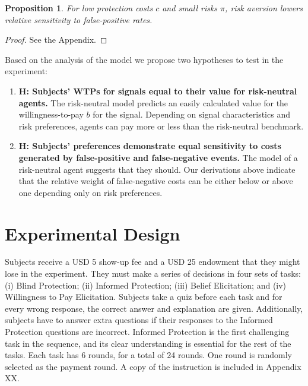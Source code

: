 \documentclass[12pt,a4paper]{article}
\newtheorem{theorem}{Proposition}
\begin{document}
\begin{theorem}
For low protection costs $c$ and small risks $\pi$, risk aversion lowers relative sensitivity to false-positive rates. 
\end{theorem}\label{thm:riskAverse2}  

\begin{proof}
See the Appendix.
\end{proof}


\noindent Based on the analysis of the model we propose two hypotheses to test in the experiment:
\begin{enumerate}
\item \textbf{H: Subjects' WTPs for signals equal to their value for risk-neutral agents.} The risk-neutral model predicts an easily calculated value for the willingness-to-pay $b$ for the signal. Depending on signal characteristics and risk preferences, agents can pay more or less than the risk-neutral benchmark. 
\item \textbf{H: Subjects' preferences demonstrate equal sensitivity to costs generated by false-positive and false-negative events.} The model of a risk-neutral agent suggests that they should. Our derivations above indicate that the relative weight of false-negative costs can be either below or above one depending only on risk preferences.
\end{enumerate}




\vspace{20pt}

\section{Experimental Design}

Subjects receive a USD 5 show-up fee and a USD 25 endowment that they might lose in the experiment. They must make a series of decisions in four sets of tasks: (i) Blind Protection; (ii) Informed Protection; (iii) Belief Elicitation; and (iv) Willingness to Pay Elicitation. Subjects take a quiz before each task and for every wrong response, the correct answer and explanation are given. Additionally, subjects have to answer extra questions if their responses to the Informed Protection questions are incorrect. Informed Protection is the first challenging task in the sequence, and its clear understanding is essential for the rest of the tasks.
Each task has 6 rounds, for a total of 24 rounds. One round is randomly selected as the payment round. A copy of the instruction is included in Appendix XX.
\end{document}
